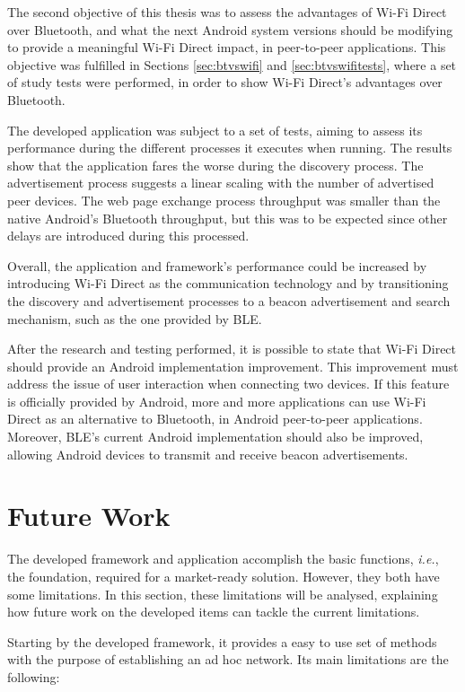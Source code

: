 The second objective of this thesis was to assess the advantages of Wi-Fi Direct over Bluetooth, and what the next Android system versions should be modifying to provide a meaningful Wi-Fi Direct impact, in peer-to-peer applications. This objective was fulfilled in Sections \ref{sec:btvswifi} and \ref{sec:btvswifitests}, where a set of study tests were performed, in order to show Wi-Fi Direct's advantages over Bluetooth.

The developed application was subject to a set of tests, aiming to assess its performance during the different processes it executes when running. The results show that the application fares the worse during the discovery process. The advertisement process suggests a linear scaling with the number of advertised peer devices. The web page exchange process throughput was smaller than the native Android's Bluetooth throughput, but this was to be expected since other delays are introduced during this processed.

Overall, the application and framework's performance could be increased by introducing Wi-Fi Direct as the communication technology and by transitioning the discovery and advertisement processes to a beacon advertisement and search mechanism, such as the one provided by \gls{BLE}.

After the research and testing performed, it is possible to state that Wi-Fi Direct should provide an Android implementation improvement. This improvement must address the issue of user interaction when connecting two devices. If this feature is officially provided by Android, more and more applications can use Wi-Fi Direct as an alternative to Bluetooth, in Android peer-to-peer applications. Moreover, \gls{BLE}'s current Android implementation should also be improved, allowing Android devices to transmit and receive beacon advertisements.

\section{Future Work}
\label{sec:futurework}

The developed framework and application accomplish the basic functions, \textit{i.e.}, the foundation, required for a market-ready solution. However, they both have some limitations. In this section, these limitations will be analysed, explaining how future work on the developed items can tackle the current limitations.

Starting by the developed framework, it provides a easy to use set of methods with the purpose of establishing an ad hoc network. Its main limitations are the following:

